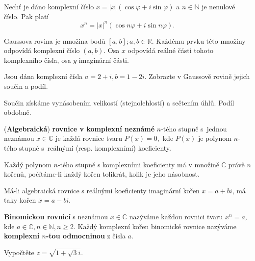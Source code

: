 \begin{veta}
    Nechť je dáno komplexní číslo $x=|x|(\cos \varphi + i \sin \varphi)$ a $n\in \mathbb N$
    je nenulové číslo. Pak platí
    $$x^n = |x|^n (\cos n\varphi + i \sin n \varphi).$$
\end{veta}

\begin{pozn}
    Gaussova rovina je množina bodů $[a,b]; a,b \in \mathbb R$.
    Každému prvku této množiny odpovídá komplexní číslo $(a,b).$ Osa $x$ odpovídá
    reálné části tohoto komplexního čísla, osa $y$ imaginární části.
\end{pozn}

\begin{priklad}
Jsou dána komplexní čísla $a=2+i,b=1-2i$. Zobrazte v Gaussově rovině jejich součin a podíl.
\end{priklad}

\begin{reseni}
Součin získáme vynásobením velikostí (stejnolehlostí) a sečtením úhlů. Podíl obdobně.
\end{reseni}

\begin{definition}
(\textbf{Algebraická}) \textbf{rovnice v komplexní neznámé} $n$-tého stupně s~jednou neznámou $x\in \mathbb C$ je každá
rovnice tvaru $P(x)=0,$ kde $P(x)$ je polynom $n$-tého stupně s~reálnými (resp.
komplexními) koeficienty.
\end{definition}

\begin{veta}
    Každý polynom $n$-tého stupně s komplexními koeficienty má v množině $\mathbb C$
    právě $n$ kořenů, počítáme-li každý kořen tolikrát, kolik je jeho násobnost.
\end{veta}

\begin{veta}
    Má-li algebraická rovnice s reálnými koeficienty imaginární kořen
    $x = a+bi$, má taky kořen $\overline{x} = a-bi.$
\end{veta}

\begin{definition}
\textbf{Binomickou rovnicí} s neznámou $x\in \mathbb C$ nazýváme každou rovnici
tvaru $x^n=a$, kde $a\in \mathbb C,n\in \mathbb N, n\geq 2.$ Každý komplexní
kořen binomické rovnice nazýváme \textbf{komplexní $n$-tou odmocninou} z čísla $a.$
\end{definition}

\begin{priklad}
Vypočtěte $z=\sqrt{1+\sqrt{3}i }. $
\end{priklad}

